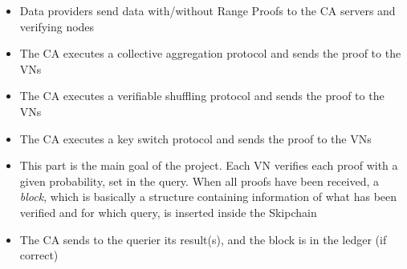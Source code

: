 \documentclass{article}
\begin{document}
\begin{itemize}
\item{Data providers send data with/without Range Proofs to the CA servers and verifying nodes}
\item{The CA executes a collective aggregation protocol and sends the proof to the VNs}
\item{The CA executes a verifiable shuffling protocol and sends the proof to the VNs}
\item{The CA executes a key switch protocol and sends the proof to the VNs}
\item{This part is the main goal of the project. Each VN verifies each proof with a given probability, set in the query. When all proofs have been received, a \textit{block}, which is basically a structure containing information of what has been verified and for which query, is inserted inside the Skipchain}
\item{The CA sends to the querier its result(s), and the block is in the ledger (if correct)}
\end{itemize}
\end{document}
